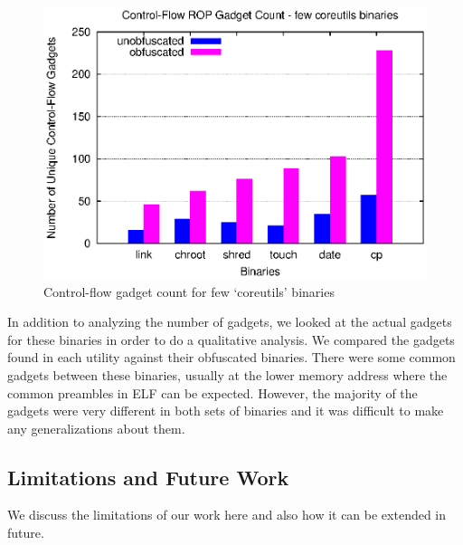 \begin{figure}[h]
    \includegraphics[width=\linewidth]{figures/control.eps}
    \captionsetup{font=footnotesize, labelfont=bf, justification=centering}
    \caption{Control-flow gadget count for few `coreutils' binaries}
    \label{fig:control}
\end{figure}


In addition to analyzing the number of gadgets, we looked at the actual 
gadgets for these binaries in order to do a qualitative analysis. We 
compared the gadgets found in each utility against their obfuscated 
binaries. There were some common gadgets between these binaries, usually 
at the lower memory address where the common preambles in ELF can be 
expected. However, the majority of the gadgets were very different in both 
sets of binaries and it was difficult to make any generalizations about 
them.


\subsection{Limitations and Future Work}
We discuss the limitations of our work here and also how it can be 
extended in future. 

